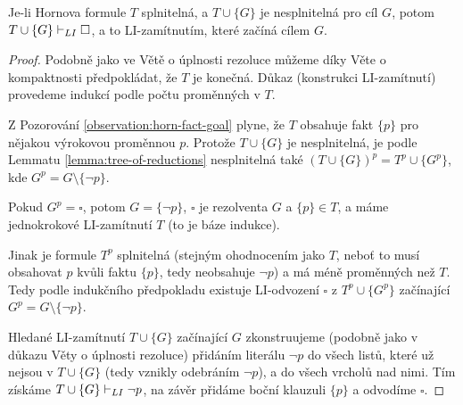 \begin{theorem}\label{theorem:completeness-of-li-resolution-for-horn}
Je-li Hornova formule $T$ splnitelná, a $T\cup\{G\}$ je nesplnitelná pro cíl $G$, potom $T\cup\{G\}\vdash_{LI}\square$, a to LI-zamítnutím, které začíná cílem $G$.   
\end{theorem}
\begin{proof}
    Podobně jako ve Větě o úplnosti rezoluce můžeme díky Věte o kompaktnosti předpokládat, že $T$ je konečná. Důkaz (konstrukci LI-zamítnutí) provedeme indukcí podle počtu proměnných v $T$.

    Z Pozorování \ref{observation:horn-fact-goal} plyne, že $T$ obsahuje fakt $\{p\}$ pro nějakou výrokovou proměnnou $p$. Protože $T\cup\{G\}$ je nesplnitelná, je podle Lemmatu \ref{lemma:tree-of-reductions} nesplnitelná také $(T\cup\{G\})^p=T^p\cup\{G^p\}$, kde $G^p=G\setminus\{\neg p\}$.
    
    Pokud $G^p=\square$, potom $G=\{\neg p\}$, $\square$ je rezolventa $G$ a $\{p\}\in T$, a máme jednokrokové LI-zamítnutí $T$ (to je báze indukce). 
    
    Jinak je formule $T^p$ splnitelná (stejným ohodnocením jako $T$, neboť to musí obsahovat $p$ kvůli faktu $\{p\}$, tedy neobsahuje $\neg p$) a má méně proměnných než $T$. Tedy podle indukčního předpokladu existuje LI-odvození $\square$ z $T^p\cup\{G^p\}$ začínající $G^p=G\setminus\{\neg p\}$.

    Hledané LI-zamítnutí $T\cup\{G\}$ začínající $G$ zkonstruujeme (podobně jako v důkazu Věty o úplnosti rezoluce) přidáním literálu $\neg p$ do všech listů, které už nejsou v $T\cup\{G\}$ (tedy vznikly odebráním $\neg p$), a do všech vrcholů nad nimi. Tím získáme $T\cup\{G\}\vdash_{LI}\neg p$, na závěr přidáme boční klauzuli $\{p\}$ a odvodíme $\square$.
\end{proof}

